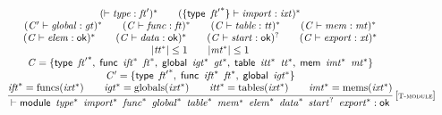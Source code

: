 $$
\begin{array}{@{}c@{}}\displaystyle
\frac{
\begin{array}{@{}c@{}}
({ \vdash }\;{\mathit{type}} : {\mathit{ft}'})^\ast
 \qquad
(\{ \begin{array}[t]{@{}l@{}}
\mathsf{type}~\,{{\mathit{ft}'}^\ast} \}\end{array} \vdash {\mathit{import}} : {\mathit{ixt}})^\ast
 \\
({\mathit{C}'} \vdash {\mathit{global}} : {\mathit{gt}})^\ast
 \qquad
({\mathit{C}} \vdash {\mathit{func}} : {\mathit{ft}})^\ast
 \qquad
({\mathit{C}} \vdash {\mathit{table}} : {\mathit{tt}})^\ast
 \qquad
({\mathit{C}} \vdash {\mathit{mem}} : {\mathit{mt}})^\ast
 \\
({\mathit{C}} \vdash {\mathit{elem}} : \mathsf{ok})^\ast
 \qquad
({\mathit{C}} \vdash {\mathit{data}} : \mathsf{ok})^\ast
 \qquad
({\mathit{C}} \vdash {\mathit{start}} : \mathsf{ok})^?
 \qquad
({\mathit{C}} \vdash {\mathit{export}} : {\mathit{xt}})^\ast
 \\
{|{{\mathit{tt}}^\ast}|} \leq 1
 \qquad
{|{{\mathit{mt}}^\ast}|} \leq 1
 \\
{\mathit{C}} = \{ \begin{array}[t]{@{}l@{}}
\mathsf{type}~\,{{\mathit{ft}'}^\ast},\; \mathsf{func}~\,{{\mathit{ift}}^\ast}~\,{{\mathit{ft}}^\ast},\; \mathsf{global}~\,{{\mathit{igt}}^\ast}~\,{{\mathit{gt}}^\ast},\; \mathsf{table}~\,{{\mathit{itt}}^\ast}~\,{{\mathit{tt}}^\ast},\; \mathsf{mem}~\,{{\mathit{imt}}^\ast}~\,{{\mathit{mt}}^\ast} \}\end{array}
 \\
{\mathit{C}'} = \{ \begin{array}[t]{@{}l@{}}
\mathsf{type}~\,{{\mathit{ft}'}^\ast},\; \mathsf{func}~\,{{\mathit{ift}}^\ast}~\,{{\mathit{ft}}^\ast},\; \mathsf{global}~\,{{\mathit{igt}}^\ast} \}\end{array}
 \\
{{\mathit{ift}}^\ast} = {\mathrm{funcs}}({{\mathit{ixt}}^\ast})
 \qquad
{{\mathit{igt}}^\ast} = {\mathrm{globals}}({{\mathit{ixt}}^\ast})
 \qquad
{{\mathit{itt}}^\ast} = {\mathrm{tables}}({{\mathit{ixt}}^\ast})
 \qquad
{{\mathit{imt}}^\ast} = {\mathrm{mems}}({{\mathit{ixt}}^\ast})
\end{array}
}{
{ \vdash }\;\mathsf{module}~\,{{\mathit{type}}^\ast}~\,{{\mathit{import}}^\ast}~\,{{\mathit{func}}^\ast}~\,{{\mathit{global}}^\ast}~\,{{\mathit{table}}^\ast}~\,{{\mathit{mem}}^\ast}~\,{{\mathit{elem}}^\ast}~\,{{\mathit{data}}^\ast}~\,{{\mathit{start}}^?}~\,{{\mathit{export}}^\ast} : \mathsf{ok}
} \, {[\textsc{\scriptsize T{-}module}]}
\qquad
\end{array}
$$

